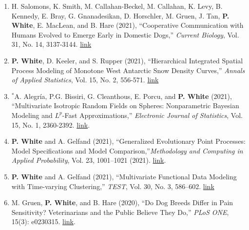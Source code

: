 \documentclass[11pt]{article}
\begin{document}
\begin{enumerate}[label=$\bullet$]

\item H. Salomons, K. Smith, M. Callahan-Beckel, M. Callahan, K. Levy, B. Kennedy, E. Bray, G. Gnanadesikan, D. Horschler, M. Gruen, J. Tan, \textbf{P. White}, E. MacLean, and B. Hare (2021), ``Cooperative Communication with Humans Evolved to Emerge Early in Domestic Dogs,'' \textit{Current Biology}, Vol. 31, No. 14, 3137-3144. \href{https://www.cell.com/current-biology/fulltext/S0960-9822(21)00880-0}{link} 


\item \textbf{P. White}, D. Keeler, and S. Rupper (2021), ``Hierarchical Integrated Spatial Process Modeling of Monotone West Antarctic Snow Density Curves,'' \textit{Annals of Applied Statistics}, Vol. 15, No. 2, 556-571. \href{http://dx.doi.org/10.1214/21-AOAS1443}{link}

\item $^*$A. Alegr\'ia, P.G. Bissiri, G. Cleanthous, E. Porcu, and \textbf{P. White} (2021), ``Multivariate Isotropic Random  Fields on Spheres: Nonparametric Bayesian Modeling and $L^p$-Fast Approximations,'' \emph{Electronic Journal of Statistics}, Vol. 15, No. 1,  2360-2392. \href{https://doi.org/10.1214/19-EJS1593}{link}.


\item \textbf{P. White} and A. Gelfand (2021), ``Generalized Evolutionary Point Processes: Model Specifications and Model Comparison,''\emph{Methodology and Computing in Applied Probability}, Vol. 23, 1001–1021 (2021). \href{https://doi.org/10.1007/s11009-020-09797-8}{link}.

\item \textbf{P. White} and A. Gelfand (2021), ``Multivariate Functional Data Modeling with Time-varying Clustering,'' \textit{TEST}, Vol. 30, No. 3, 586–602. \href{http://link.springer.com/article/10.1007/s11749-020-00733-z}{link}
\item M. Gruen, \textbf{P. White}, and B. Hare (2020), ``Do Dog Breeds Differ in Pain Sensitivity? Veterinarians and the Public Believe They Do,'' \emph{PLoS ONE}, 15(3): e0230315. \href{https://doi.org/10.1371/journal.pone.0230315}{link}.


\end{enumerate}
\end{document}
